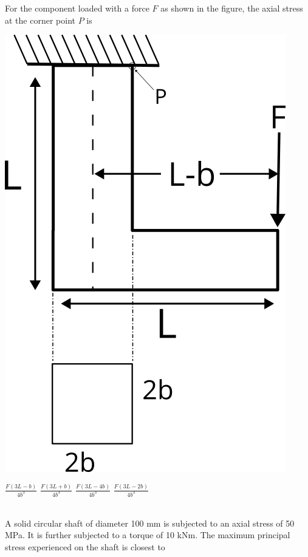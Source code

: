 \documentclass[addpoints,11pt]{exam}
\begin{document}
\begin{questions}
        \question For the component loaded with a force $F$ as shown in the figure, the axial stress at the corner point $P$ is\\

        \begin{center}
            \includegraphics[scale=0.3]{q31}
        \end{center}

        \begin{oneparchoices}
            \choice $\frac{F(3L-b)}{4b^3}$
            \choice $\frac{F(3L+b)}{4b^3}$
            \choice $\frac{F(3L-4b)}{4b^3}$
            \choice $\frac{F(3L-2b)}{4b^3}$
        \end{oneparchoices}\\
        
        \question A solid circular shaft of diameter 100 mm is subjected to an axial stress of 50 MPa. It is further subjected to a torque of 10 kNm. The maximum principal stress experienced on the shaft is closest to\\


\end{questions}
\end{document}
